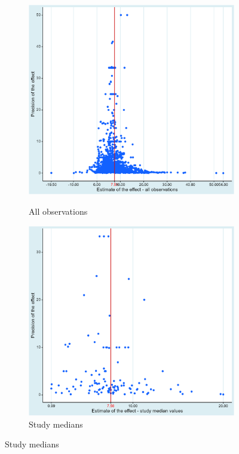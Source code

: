\begin{figure}[!t]
\begin{center}
\caption{The funnel plot shows no immediately suspicious patterns}
\label{fig:funnel_plot}
\begin{subfigure}[b]{0.45\textwidth}
   \caption{All observations}
   \includegraphics[width=0.95\linewidth]{Figures/funnel.png}
   \label{fig:funnel_plot_all} 
\end{subfigure}
\begin{subfigure}[b]{0.45\textwidth}
   \caption{Study medians}
   \includegraphics[width=0.95\linewidth]{Figures/funnel_medians.png}

\end{subfigure}
\end{center}
\end{figure}
